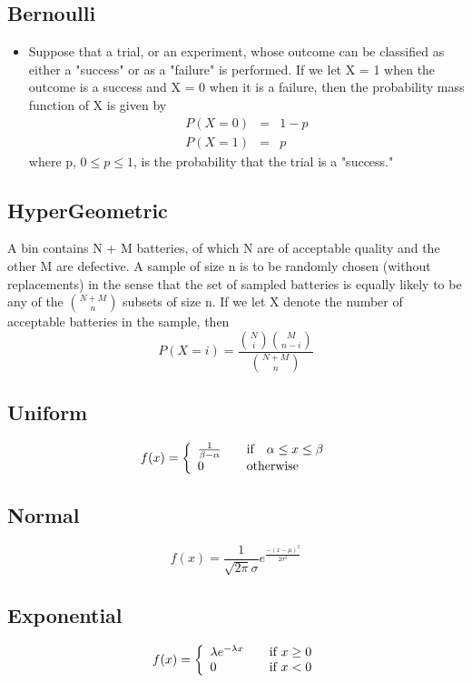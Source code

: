 \documentclass[a4paper,oneside]{book}
\begin{document}
\subsection{Bernoulli}
\begin{itemize}
\item Suppose that a trial, or an experiment, whose outcome can be classified as either a "success"
or as a "failure" is performed. If we let X = 1 when the outcome is a success and X = 0
when it is a failure, then the probability mass function of X is given by
\begin{eqnarray}
P(X = 0) & = & 1 - p\\
P(X = 1) & = & p
\end{eqnarray}
where p, $0 \leq p \leq 1$, is the probability that the trial is a "success."
\end{itemize}
\subsection{HyperGeometric}
A bin contains N + M batteries, of which N are of acceptable quality and the other M are
defective. A sample of size n is to be randomly chosen (without replacements) in the sense
that the set of sampled batteries is equally likely to be any of the ${N + M \choose n}$ subsets of size n.
If we let X denote the number of acceptable batteries in the sample, then
$$ P(X = i) = \dfrac{{N \choose i}{M \choose n-i}}{{N+M \choose n}}$$
\subsection{Uniform}
$$ f(x) = \left\{ 
  \begin{array}{l l}
    \frac{1}{\beta - \alpha} & \quad \text{if} \hspace{1em} \alpha \leq x \leq  \beta\\
    0 & \quad \text{otherwise}
  \end{array} \right.  $$
\subsection{Normal}
$$ f(x) = \dfrac{1}{\sqrt{2 \pi }\sigma} e^{\frac{-(x - \mu)^{2}}{2 \sigma^{2}}}$$
\subsection{Exponential}
$$ f(x) = \left\{ 
  \begin{array}{l l}
    \lambda e^{- \lambda x} & \quad \text{if      } x \geq 0\\
    0 & \quad \text{if     } x < 0
  \end{array} \right.  $$
\end{document}

